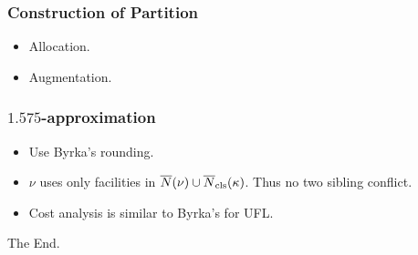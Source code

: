 \documentclass[handout, hyperref, xcolor=dvipsnames]{beamer}
\begin{document}
\begin{frame}
  \frametitle{Construction of Partition}
  \begin{itemize}
  \item Allocation.
  \item Augmentation.
  \end{itemize}
\end{frame}

\begin{frame}
  \frametitle{$1.575$-approximation}

  \begin{itemize}
  \item Use Byrka's rounding.
  \item $\nu$ uses only facilities in ${\overline{N}}(\nu) \cup
    {\overline{N}}_{{\mbox{\scriptsize\rm cls}}}(\kappa)$. Thus no two sibling conflict.
  \item Cost analysis is similar to Byrka's for UFL.
  \end{itemize}
\end{frame}

\begin{frame}
  \Huge{The End.}
\end{frame}

\end{document}
